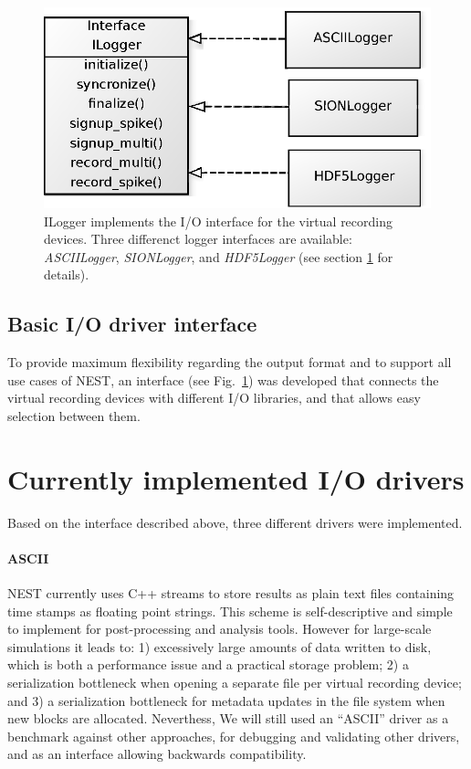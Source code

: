 \documentclass[]{YIC2015}
\begin{document}
\begin{figure}[tb]
\centering %
\includegraphics[scale=0.5]{loggerinterface.eps}
\caption{ILogger implements the I/O interface for the virtual
  recording devices.  Three differenct logger interfaces are
  available: \emph{ASCIILogger}, \emph{SIONLogger}, and
  \emph{HDF5Logger} (see section \ref{sec:io-drivers} for details).}
\label{fig:loggerinterface}
\end{figure}

\subsection{Basic I/O driver interface}

To provide maximum flexibility regarding the output format and to support all 
use cases of NEST, an interface (see Fig.~\ref{fig:loggerinterface}) was 
developed that connects the virtual recording devices with different I/O 
libraries, and that allows easy selection between them.


\section{Currently implemented I/O drivers}
\label{sec:io-drivers}

Based on the interface described above, three different drivers were
implemented.

\paragraph{ASCII}

NEST currently uses C++ streams to store results as plain text files
containing time stamps as floating point strings. This scheme is
self-descriptive and simple to implement for post-processing and
analysis tools.
%
However for large-scale simulations it leads to: 1) excessively large
amounts of data written to disk, which is both a performance issue and
a practical storage problem; 2) a serialization bottleneck when
opening a separate file per virtual recording device; and 3) a
serialization bottleneck for metadata updates in the file system when
new blocks are allocated.
Neverthess, We will still used an ``ASCII'' driver as a benchmark against other
approaches, for debugging and validating other drivers, and as an
interface allowing backwards compatibility.
\end{document}
